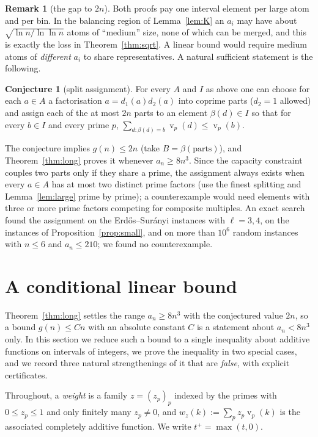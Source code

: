 \documentclass[11pt]{article}
\theoremstyle{definition}
\newtheorem{remark}[theorem]{Remark}
\newtheorem{conjecture}[theorem]{Conjecture}
\DeclareMathOperator{\vp}{v}
\begin{document}
\begin{remark}[the gap to $2n$]
Both proofs pay one interval element per large atom and per bin. In the balancing region of
Lemma~\ref{lem:K} an $a_i$ may have about $\sqrt{\ln n/\ln\ln n}$ atoms of ``medium'' size, none of which can
be merged, and this is exactly the loss in Theorem~\ref{thm:sqrt}. A linear bound would require medium atoms
of \emph{different} $a_i$ to share representatives. A natural sufficient statement is the following.
\end{remark}

\begin{conjecture}[split assignment]\label{conj:S}
For every $A$ and $I$ as above one can choose for each $a\in A$ a factorisation $a=d_1(a)d_2(a)$ into
coprime parts ($d_2=1$ allowed) and assign each of the at most $2n$ parts to an element $\beta(d)\in I$ so
that for every $b\in I$ and every prime $p$, $\sum_{d:\beta(d)=b}\vp_p(d)\le\vp_p(b)$.
\end{conjecture}

The conjecture implies $g(n)\le 2n$ (take $B=\beta(\text{parts})$), and Theorem~\ref{thm:long} proves it
whenever $a_n\ge 8n^3$. Since the capacity constraint couples
two parts only if they share a prime, the assignment always exists when every $a\in A$ has at most two
distinct prime factors (use the finest splitting and Lemma~\ref{lem:large} prime by prime); a counterexample
would need elements with three or more prime factors competing for composite multiples. An exact search found
the assignment on the Erd\H{o}s--Sur\'anyi instances with $\ell=3,4$, on the instances of
Proposition~\ref{prop:small}, and on more than $10^6$ random instances with $n\le 6$ and $a_n\le 210$;
we found no counterexample.

\section{A conditional linear bound}\label{sec:linear}

Theorem~\ref{thm:long} settles the range $a_n\ge 8n^3$ with the conjectured value $2n$, so a bound $g(n)\le Cn$
with an absolute constant $C$ is a statement about $a_n<8n^3$ only. In this section we reduce such a bound to a single
inequality about additive functions on intervals of integers, we prove the inequality in two special cases, and we
record three natural strengthenings of it that are \emph{false}, with explicit certificates.

Throughout, a \emph{weight} is a family $z=(z_p)_p$ indexed by the primes with $0\le z_p\le 1$ and only finitely many
$z_p\ne0$, and $w_z(k):=\sum_p z_p\vp_p(k)$ is the associated completely additive function. We write $t^+=\max(t,0)$.
\end{document}

